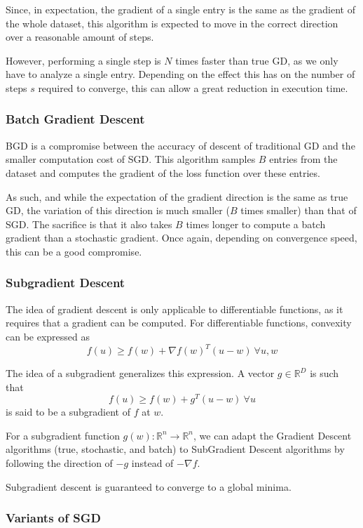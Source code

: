 \documentclass{article}
\newcommand{\R}{\mathbb{R}}
\begin{document}
Since, in expectation, the gradient of a single entry is the same as the gradient of the whole dataset, this algorithm is expected to move in the correct direction over a reasonable amount of steps.  

However, performing a single step is $N$ times faster than true GD, as we only have to analyze a single entry.
Depending on the effect this has on the number of steps $s$ required to converge, this can allow a great reduction in execution time.

\subsubsection{Batch Gradient Descent} 

BGD is a compromise between the accuracy of descent of traditional GD and the smaller computation cost of SGD. 
This algorithm samples $B$ entries from the dataset and computes the gradient of the loss function over these entries.

As such, and while the expectation of the gradient direction is the same as true GD, the variation of this direction is much smaller ($B$ times smaller) than that of SGD.
The sacrifice is that it also takes $B$ times longer to compute a batch gradient than a stochastic gradient.
Once again, depending on convergence speed, this can be a good compromise.

\subsubsection{Subgradient Descent}

The idea of gradient descent is only applicable to differentiable functions, as it requires that a gradient can be computed.
For differentiable functions, convexity can be expressed as
$$
f(u) \geq f(w) + \nabla f(w)^T (u-w) \ \forall u,w
$$

The idea of a subgradient generalizes this expression.
A vector $g \in \R^D$ is such that
$$
f(u) \geq f(w) + g^T (u - w) \ \forall u
$$
is said to be a subgradient of $f$ at $w$.

For a subgradient function $g(w): \R^n \to \R^n$, we can adapt the Gradient Descent algorithms (true, stochastic, and batch) to SubGradient Descent algorithms by following the direction of $-g$ instead of $-\nabla f$.

Subgradient descent is guaranteed to converge to a global minima.

\subsubsection{Variants of SGD}
\end{document}
